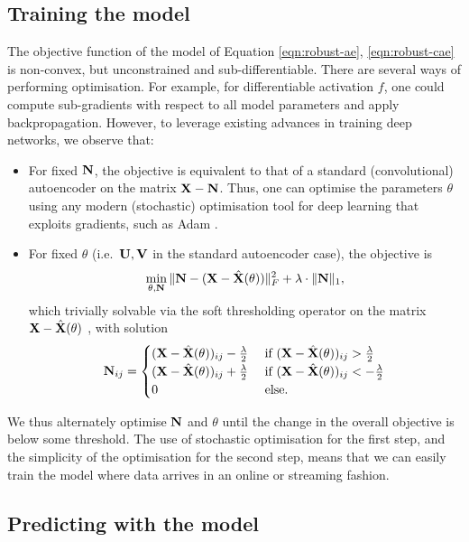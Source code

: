 %
\subsection{Training the model}
\label{sec:training}

The objective function of the model of Equation \ref{eqn:robust-ae}, \ref{eqn:robust-cae} is non-convex, but unconstrained and sub-differentiable.
There are several ways of performing optimisation.
For example, for differentiable activation $f$, one could compute sub-gradients with respect to all model parameters and apply backpropagation.
However, to leverage existing advances in training deep networks, we observe that:
\begin{itemize}
	\item For fixed $\mathbf{N}$, the objective is equivalent to that of a standard (convolutional) autoencoder on the matrix $\mathbf{X} - \mathbf{N}$.
	Thus, one can optimise the parameters $\theta$ using any modern (stochastic) optimisation tool for deep learning that exploits gradients, such as Adam \cite{kingma2014adam}.

	\item For fixed $\theta$ (i.e.\, $\mathbf{U}, \mathbf{V}$ in the standard autoencoder case), the objective is
	$$ \min_{\theta, \mathbf{N}} \| \mathbf{N} - (\mathbf{X} - \hat{\mathbf{X}}( \theta )) \|_F^2 + \lambda \cdot \| \mathbf{N} \|_1, $$
	which trivially solvable via the soft thresholding operator on the matrix $\mathbf{X} - \hat{\mathbf{X}}( \theta )$ \cite{Bach:2011}, with solution
	$$ \mathbf{N}_{ij} =
	\begin{cases}
		(\mathbf{X} - \hat{\mathbf{X}}( \theta ))_{ij} - \frac{\lambda}{2} & \text{ if } (\mathbf{X} - \hat{\mathbf{X}}( \theta ))_{ij} > \frac{\lambda}{2} \\
		(\mathbf{X} - \hat{\mathbf{X}}( \theta ))_{ij} + \frac{\lambda}{2} & \text{ if } (\mathbf{X} - \hat{\mathbf{X}}( \theta ))_{ij} < -\frac{\lambda}{2} \\
		0 & \text{ else. }
	\end{cases}
	$$
\end{itemize}
We thus alternately optimise $\mathbf{N}$ and $\theta$ until the change in the overall objective is below some threshold.
The use of stochastic optimisation for the first step, and the simplicity of the optimisation for the second step, means that we can easily train the model where data arrives in an online or streaming fashion.


%
\subsection{Predicting with the model}

